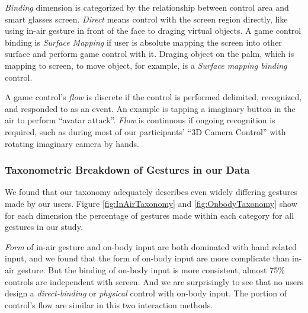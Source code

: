 \documentclass{sigchi}
\begin{document}
  \emph{Binding} dimension is categorized by the relationship between control area and smart glasses screen. \emph{Direct} means control with the screen region directly, like using in-air gesture in front of the face to draging virtual objects. A game control binding is \emph{Surface Mapping} if user is absolute mapping the screen into other surface and perform game control with it. Draging object on the palm, which is mapping to screen, to move object, for example, is a \emph{Surface mapping binding} control. 

  A game control's \emph{flow} is discrete if the control is performed delimited, recognized, and responded to as an event. An example is tapping a imaginary button in the air to perform ``avatar attack''. \emph{Flow} is continuous if ongoing recognition is required, such as during most of our participants' ``3D Camera Control'' with rotating imaginary camera by hands. 
 


 \subsubsection{Taxonometric Breakdown of Gestures in our Data}
We found that our taxonomy adequately describes even widely differing gestures made by our users. Figure \ref{fig:InAirTaxonomy} and \ref{fig:OnbodyTaxonomy} show for each dimension the percentage of gestures made within each category for all gestures in our study.

\emph{Form} of in-air gesture and on-body input are both dominated with hand related input, and we found that the form of on-body input are more complicate than in-air gesture. But the binding of on-body input is more consistent, almost 75\% controls are independent with screen. And we are surprisingly to see that no users design a \emph{direct-binding} or \emph{physical} control with on-body input. The portion of control's flow are similar in this two interaction methods.
\end{document}

